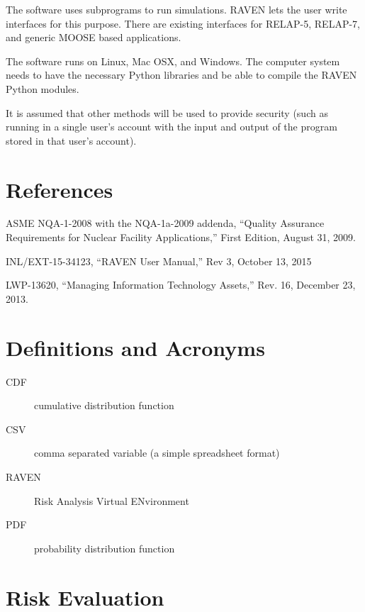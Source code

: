 \documentclass{article}
\begin{document}
The software uses subprograms to run simulations.  RAVEN lets the user
write interfaces for this purpose.  There are existing interfaces for
RELAP-5, RELAP-7, and generic MOOSE based applications.

The software runs on Linux, Mac OSX, and Windows.  The computer system
needs to have the necessary Python libraries and be able to compile
the RAVEN Python modules.

It is assumed that other methods will be used to provide security
(such as running in a single user's account with the input and output
of the program stored in that user's account).

\section{References}

\begin{flushleft}
ASME NQA-1-2008 with the NQA-1a-2009 addenda, ``Quality Assurance
Requirements for Nuclear Facility Applications,'' First Edition, August
31, 2009.

INL/EXT-15-34123, ``RAVEN User Manual,'' Rev 3, October 13, 2015

LWP-13620, ``Managing Information Technology Assets,'' Rev. 16, December
23, 2013.
\end{flushleft}

\section{Definitions and Acronyms}

\begin{description}
\item[CDF] cumulative distribution function
\item[CSV] comma separated variable (a simple spreadsheet format)
\item[RAVEN] Risk Analysis Virtual ENvironment
\item[PDF] probability distribution function
\end{description}

\section{Risk Evaluation}
\end{document}
